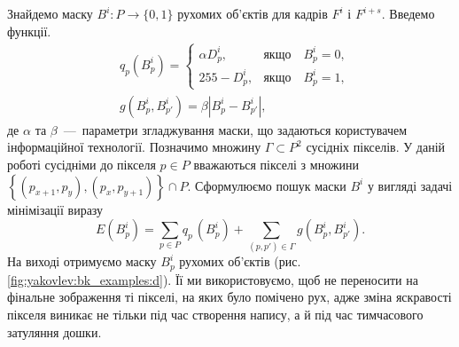Знайдемо маску $B^{i}:P \rightarrow \{0,1\}$ рухомих
об'єктів для кадрів \(F^{i}\) і \(F^{i + s}\).
Введемо функції.
\begin{align*}
    &q_{p}(B_{p}^{i}) =
      \begin{cases}
        \alpha D_{p}^{i}, & \textit{якщо} \quad B_{p}^{i} = 0, \\
        255 - D_{p}^{i},  & \textit{якщо} \quad B_{p}^{i} = 1 ,
      \end{cases} \\
    &g(B_{p}^{i},B_{p'}^{i}) = \beta|B_{p}^{i} - B_{p'}^{i}|,
\end{align*}
де \(\alpha\) та \(\beta\)~---~параметри згладжування маски, що задаються
користувачем інформаційної технології. Позначимо множину
$\Gamma \subset P^{2}$ сусідніх пікселів. У даній роботі сусідніми до
пікселя \(p \in P\) вважаються пікселі з множини
\(\left\{ \left( p_{x + 1},p_{y} \right),\left( p_{x},p_{y + 1} \right) \right\} \cap P\).
Сформулюємо пошук маски \(B^{i}\) у вигляді задачі мінімізації виразу
\begin{equation*}
    E\left( B_{p}^{i} \right) = \sum_{p \in P}^{}{q_{{p\ }}( B_{p}^{i}) +}\sum_{(p,p') \in \Gamma}^{}g(B_{p}^{i},B_{p'}^{i}).
\end{equation*}
На виході отримуємо маску \(B_{p}^{i}\) рухомих об'єктів (рис.
\ref{fig:yakovlev:bk_examples:d}).
Її ми використовуємо, щоб не переносити на фінальне зображення ті
пікселі, на яких було помічено рух, адже зміна яскравості пікселя
виникає не тільки під час створення напису, а й під час тимчасового
затуляння дошки.

